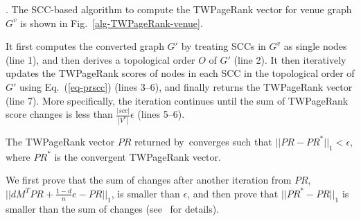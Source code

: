 {%


.
The SCC-based algorithm to compute the TWPageRank vector for venue graph $G^v$ is shown in Fig.~\ref{alg-TWPageRank-venue}.

It first computes the converted graph $G'$  by treating SCCs in $G^v$ as single nodes (line 1), and then derives a topological order $O$ of $G'$ (line 2). It then iteratively updates the TWPageRank scores of nodes in each SCC in the topological order of $G'$ using  Eq.~(\ref{eq-prscc}) (lines 3--6), and finally returns the TWPageRank vector (line 7). More specifically, the iteration continues until the sum of TWPageRank score changes is less than $\frac{|scc|}{|V^v|} \epsilon$ (lines 5--6).




\begin{lemma} \label{prop-prscc}
The TWPageRank vector $PR$ returned by~\twprscc converges such that $||PR-PR^*||_1 < \epsilon$, where $PR^*$ is the convergent TWPageRank vector.
\end{lemma}

\begin{proofSketch}
We first prove that the sum of changes after another iteration from $PR$, \ie $||d M^T PR + \frac{1-d}{n} e-PR||_1$, is smaller than $\epsilon$, and then prove that $||PR^*-PR||_1$ is smaller than the sum of changes (see~\cite {ERank-full} for details). %
\end{proofSketch}


}
